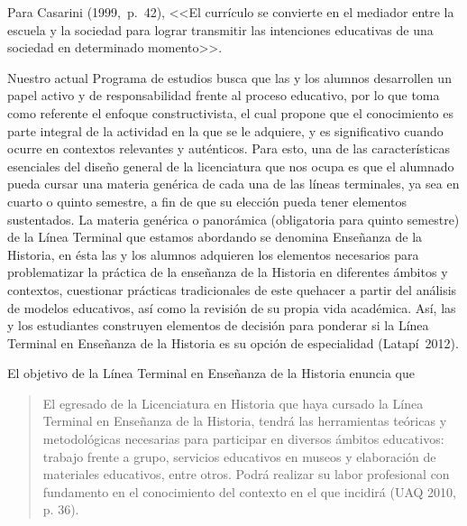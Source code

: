 Para Casarini (1999,~p.~42), <<El currículo se convierte en el mediador 
entre la escuela y la sociedad para lograr transmitir las intenciones 
educativas de una sociedad en determinado momento>>. 

Nuestro actual Programa de estudios busca que las y los alumnos 
desarrollen un papel activo y de responsabilidad frente al proceso 
educativo, por lo que toma como referente el enfoque constructivista, el 
cual propone que el conocimiento es parte integral de la actividad en la 
que se le adquiere,  y es significativo cuando ocurre en contextos 
relevantes y auténticos. Para esto, una de las características 
esenciales del diseño general de la licenciatura que nos ocupa es que 
el alumnado pueda cursar una materia genérica de cada una de las líneas 
terminales, ya sea en cuarto o quinto semestre, a fin de que su 
elección pueda tener elementos sustentados. La materia genérica o 
panorámica (obligatoria para quinto semestre) de la Línea Terminal que 
estamos abordando se denomina Enseñanza de la Historia, en ésta las y 
los alumnos adquieren los elementos necesarios para problematizar la 
práctica de la enseñanza de la Historia en diferentes ámbitos y 
contextos, cuestionar prácticas tradicionales de este quehacer a partir 
del análisis de modelos educativos, así como la revisión de su propia 
vida académica. Así, las y los estudiantes construyen elementos de 
decisión para ponderar si la Línea Terminal en Enseñanza de la Historia 
es su opción de especialidad (Latapí~2012).  
\newpage

El objetivo de la Línea Terminal en Enseñanza de la Historia 
enuncia que

\begin{quotation}
El egresado de la Licenciatura en Historia que haya cursado la Línea 
Terminal en Enseñanza de la Historia, tendrá las herramientas teóricas 
y metodológicas necesarias para participar en diversos ámbitos 
educativos: trabajo frente a grupo, servicios educativos en museos y 
elaboración de materiales educativos, entre otros. Podrá realizar su 
labor profesional con fundamento en el conocimiento del contexto en el 
que incidirá (UAQ 2010, p. 36).
\end{quotation}

